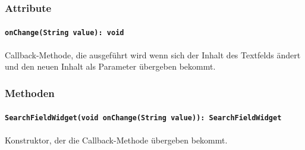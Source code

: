 \documentclass{entwurfsheft}
\begin{document}
\subsubsection*{Attribute}
\paragraph{\texttt{onChange(String value): void}}
Callback-Methode, die ausgeführt wird wenn sich der Inhalt des Textfelds ändert und den neuen Inhalt als Parameter übergeben bekommt.
\subsubsection*{Methoden}
\paragraph{\texttt{SearchFieldWidget(void onChange(String value)): SearchFieldWidget}}
Konstruktor, der die Callback-Methode übergeben bekommt.
\newpage
\end{document}
